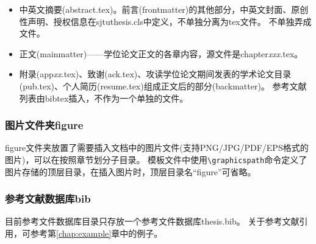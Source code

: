\begin{itemize}[noitemsep,topsep=0pt,parsep=0pt,partopsep=0pt]
	\item 中英文摘要(abstract.tex)。前言(frontmatter)的其他部分，中英文封面、原创性声明、授权信息在sjtuthesis.cls中定义，不单独分离为tex文件。
不单独弄成文件。
	\item 正文(mainmatter)——学位论文正文的各章内容，源文件是chapter\emph{xxx}.tex。
	\item 附录(app\emph{xx}.tex)、致谢(ack.tex)、攻读学位论文期间发表的学术论文目录(pub.tex)、个人简历(resume.tex)组成正文后的部分(backmatter)。
参考文献列表由bibtex插入，不作为一个单独的文件。
\end{itemize}

\subsubsection{图片文件夹figure}
\label{sec:fig}

figure文件夹放置了需要插入文档中的图片文件(支持PNG/JPG/PDF/EPS格式的图片)，可以在按照章节划分子目录。
模板文件中使用\verb|\graphicspath|命令定义了图片存储的顶层目录，在插入图片时，顶层目录名“figure”可省略。

\subsubsection{参考文献数据库bib}
\label{sec:bib}

目前参考文件数据库目录只存放一个参考文件数据库thesis.bib。
关于参考文献引用，可参考第\ref{chap:example}章中的例子。

